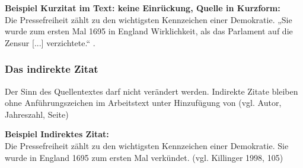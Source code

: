 \documentclass[a4paper, 12pt, xcolor=dvipsnames]{scrartcl}		%
\begin{document}
\textbf{Beispiel Kurzitat im Text: keine Einrückung, Quelle in Kurzform:}\\
Die Pressefreiheit zählt zu den wichtigsten Kennzeichen einer Demokratie. „Sie wurde zum ersten Mal
1695 in England Wirklichkeit, als das Parlament auf die Zensur [...] verzichtete.“ \cite[S~105]{11_Killinger}.

\subsubsection{Das indirekte Zitat}
\begin{Merksatz}
Der Sinn des Quellentextes darf nicht verändert werden. Indirekte Zitate bleiben ohne Anführungszeichen im Arbeitstext unter Hinzufügung von (vgl. Autor, Jahreszahl, Seite)
\end{Merksatz}
%
\textbf{Beispiel Indirektes Zitat:}\\
Die Pressefreiheit zählt zu den wichtigsten Kennzeichen einer Demokratie. Sie wurde in England
1695 zum ersten Mal verkündet. (vgl. Killinger 1998, 105)
\newpage

%
% 
%
%
%
\end{document}
